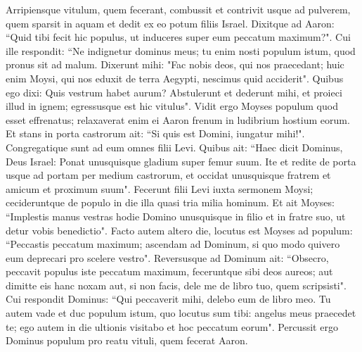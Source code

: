 \begin{biblechapter}
\verse Arripiensque vitulum, quem fecerant, combussit et contrivit usque ad pulverem, quem sparsit in aquam et dedit ex eo potum filiis Israel. 
\verse Dixitque ad Aaron: “Quid tibi fecit hic populus, ut induceres super eum peccatum maximum?". 
\verse Cui ille respondit: “Ne indignetur dominus meus; tu enim nosti populum istum, quod pronus sit ad malum. 
\verse Dixerunt mihi: "Fac nobis deos, qui nos praecedant; huic enim Moysi, qui nos eduxit de terra Aegypti, nescimus quid acciderit". 
\verse Quibus ego dixi: Quis vestrum habet aurum? Abstulerunt et dederunt mihi, et proieci illud in ignem; egressusque est hic vitulus". 
\verse Vidit ergo Moyses populum quod esset effrenatus; relaxaverat enim ei Aaron frenum in ludibrium hostium eorum. 
\verse Et stans in porta castrorum ait: “Si quis est Domini, iungatur mihi!". Congregatique sunt ad eum omnes filii Levi. 
\verse Quibus ait: “Haec dicit Dominus, Deus Israel: Ponat unusquisque gladium super femur suum. Ite et redite de porta usque ad portam per medium castrorum, et occidat unusquisque fratrem et amicum et proximum suum". 
\verse Fecerunt filii Levi iuxta sermonem Moysi; cecideruntque de populo in die illa quasi tria milia hominum. 
\verse Et ait Moyses: “Implestis manus vestras hodie Domino unusquisque in filio et in fratre suo, ut detur vobis benedictio". 
\verse Facto autem altero die, locutus est Moyses ad populum: “Peccastis peccatum maximum; ascendam ad Dominum, si quo modo quivero eum deprecari pro scelere vestro". 
\verse Reversusque ad Dominum ait: “Obsecro, peccavit populus iste peccatum maximum, feceruntque sibi deos aureos; aut dimitte eis hanc noxam  
\verse aut, si non facis, dele me de libro tuo, quem scripsisti". 
\verse Cui respondit Dominus: “Qui peccaverit mihi, delebo eum de libro meo. 
\verse Tu autem vade et duc populum istum, quo locutus sum tibi: angelus meus praecedet te; ego autem in die ultionis visitabo et hoc peccatum eorum". 
\verse Percussit ergo Dominus populum pro reatu vituli, quem fecerat Aaron. 
\end{biblechapter}

